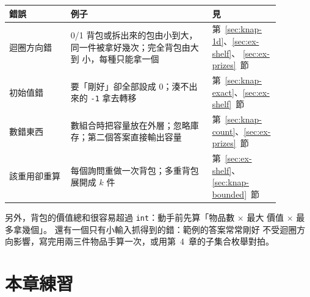 \begin{center}
\begin{tabular}{p{0.2\linewidth}p{0.46\linewidth}p{0.22\linewidth}}
\toprule
錯誤 & 例子 & 見 \\
\midrule
迴圈方向錯 & 0/1 背包或拆出來的包由小到大，同一件被拿好幾次；完全背包由大到
小，每種只能拿一個 & 第~\ref{sec:knap-1d}、\ref{sec:ex-shelf}、
\ref{sec:ex-prizes}~節 \\
初始值錯 & 要「剛好」卻全部設成 $0$；湊不出來的 \texttt{-1} 拿去轉移 &
第~\ref{sec:knap-exact}、\ref{sec:ex-shelf}~節 \\
數錯東西 & 數組合時把容量放在外層；忽略庫存；第二個答案直接輸出容量 &
第~\ref{sec:knap-count}、\ref{sec:ex-prizes}~節 \\
該重用卻重算 & 每個詢問重做一次背包；多重背包展開成 $k$ 件 &
第~\ref{sec:ex-shelf}、\ref{sec:knap-bounded}~節 \\
\bottomrule
\end{tabular}
\end{center}

另外，背包的價值總和很容易超過 \texttt{int}：動手前先算「物品數 $\times$ 最大
價值 $\times$ 最多拿幾個」。 還有一個只有小輸入抓得到的錯：範例的答案常常剛好
不受迴圈方向影響，寫完用兩三件物品手算一次，或用第~4~章的子集合枚舉對拍。

\section{本章練習}
\label{sec:knap-exercises}

